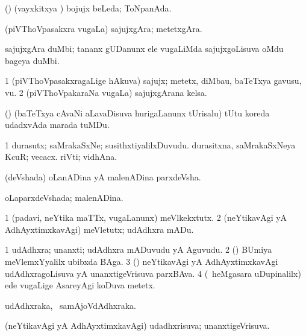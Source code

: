 {{\noindent
\gl{\pagu}
\expl{}
\bmng
{}  (\hA) (vayxkitxya \vi) bojujx beLeda; ToNpanAda. 
\emng
\eentry

\bentry
{} 
\gl{\nA}
\expl{}
\bmng
(piVThoVpasakxra \mo vugaLa) sajujxgAra; metetxgAra. 
\emng
\eentry

\bentry
{} 
\gl{\nA}
\expl{}
\bmng
sajujxgAra duMbi; tananx gUDanunx ele \mo vugaLiMda sajujxgoLisuva oMdu bageya duMbi. 
\emng
\eentry

\bentry
{} 
\gl{\nA}
\expl{}
\bmng
\bnum
\num{1} (piVThoVpasakxragaLige hAkuva) sajujx; metetx, diMbau, baTeTxya gavusu, \mo vu. 
\num{2} (piVThoVpakaraNa \mo vugaLa) sajujxgArana kelsa. 
\enum
\emng
\eentry

\bentry
{} 
\gl{\nA}
\expl{}
\bmng
(\nw) (baTeTxya cAvaNi aLavaDisuva hurigaLanunx tUrisalu) tUtu koreda udadxvAda marada tuMDu. 
\emng
\eentry

\bentry
{} 
\gl{\nA}
\bmng
\bnum
\num{1} durasutx; saMrakaSxNe; susithxtiyalilxDuvudu. 
 durasitxna, saMrakaSxNeya 
\banum
{} KcuR; vecacx. 
 riVti; vidhAna. 
\eanum
\numie
\enum
\emng
\eentry

\bentry
{} 
\gl{\nA}
\expl{}
\bmng
(deVshada) oLanADina yA malenADina parxdeVsha. 
\emng
\eentry

\bentry
{} 
\gl{\gu}
\expl{}
\bmng
oLaparxdeVshada; malenADina. 
\emng
\eentry

\bentry
{} 
\gl{\sakirx}
\expl{}
\bmng
\bnum
\num{1} (padavi, neYtika maTTx, \mo vugaLanunx) meVlkekxtutx. 
\num{2} (neYtikavAgi yA AdhAyxtimxkavAgi) meVletutx; udAdhxra mADu. 
\enum
\emng
\eentry

\bentry
{} 
\gl{\nA}
\expl{}
\bmng
\bnum
\num{1} udAdhxra; unanxti; udAdhxra mADuvudu yA Aguvudu. 
\num{2} (\BUvi) BUmiya meVlemxYyalilx ubibxda BAga. 
\num{3} (\AmA) neYtikavAgi yA AdhAyxtimxkavAgi udAdhxragoLisuva yA unanxtigeVrisuva parxBAva. 
\num{4} (\kanmu\ heMgasara uDupinalilx) ede \mo vugaLige AsareyAgi koDuva metetx. 
\enum
\emng
\eentry

\bentry
{} 
\gl{\nA}
\expl{}
\bmng
udAdhxraka, \kanmu\ samAjoVdAdhxraka. 
\emng
\eentry

\bentry
{} 
\gl{\gu}
\expl{}
\bmng
(neYtikavAgi yA AdhAyxtimxkavAgi) udadhxrisuva; unanxtigeVrisuva. 
\emng
\eentry

}}
